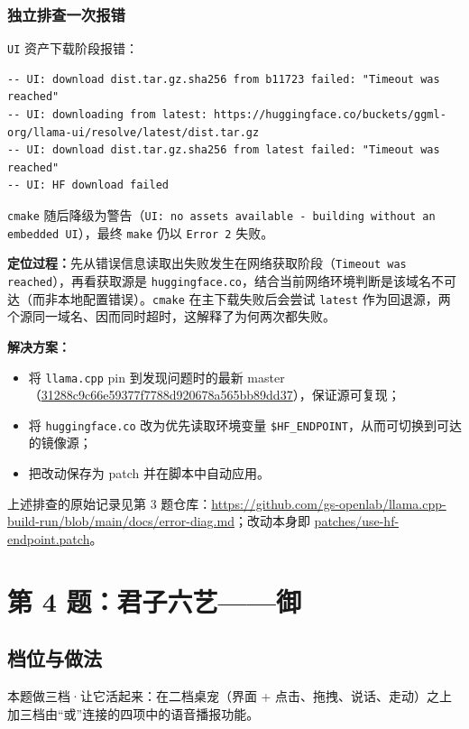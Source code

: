 \documentclass[a4paper, 12pt, linespread=1.35]{ctexart}   %
\newcommand{\keepwithnext}{\par\nobreak}
\begin{document}
\subsubsection{独立排查一次报错}
\texttt{UI} 资产下载阶段报错：\keepwithnext
\begin{lstlisting}
-- UI: download dist.tar.gz.sha256 from b11723 failed: "Timeout was reached"
-- UI: downloading from latest: https://huggingface.co/buckets/ggml-org/llama-ui/resolve/latest/dist.tar.gz
-- UI: download dist.tar.gz.sha256 from latest failed: "Timeout was reached"
-- UI: HF download failed
\end{lstlisting}
\texttt{cmake} 随后降级为警告（\texttt{UI: no assets available - building without an embedded UI}），最终 \texttt{make} 仍以 \texttt{Error 2} 失败。

\textbf{定位过程：}先从错误信息读取出失败发生在网络获取阶段（\texttt{Timeout was reached}），再看获取源是 \texttt{huggingface.co}，结合当前网络环境判断是该域名不可达（而非本地配置错误）。\texttt{cmake} 在主下载失败后会尝试 \texttt{latest} 作为回退源，两个源同一域名、因而同时超时，这解释了为何两次都失败。

\textbf{解决方案：}
\begin{itemize}
  \item 将 \texttt{llama.cpp} pin 到发现问题时的最新 master（\url{31288c9c66e59377f7788d920678a565bb89dd37}），保证源可复现；
  \item 将 \texttt{huggingface.co} 改为优先读取环境变量 \texttt{\$HF\_ENDPOINT}，从而可切换到可达的镜像源；
  \item 把改动保存为 patch 并在脚本中自动应用。
\end{itemize}

上述排查的原始记录见第 3 题仓库：\url{https://github.com/gs-openlab/llama.cpp-build-run/blob/main/docs/error-diag.md}；改动本身即 \url{patches/use-hf-endpoint.patch}。

\section{第 4 题：君子六艺——御}

\subsection{档位与做法}
本题做三档·让它活起来：在二档桌宠（界面 + 点击、拖拽、说话、走动）之上加三档由“或”连接的四项中的语音播报功能。
\end{document}
